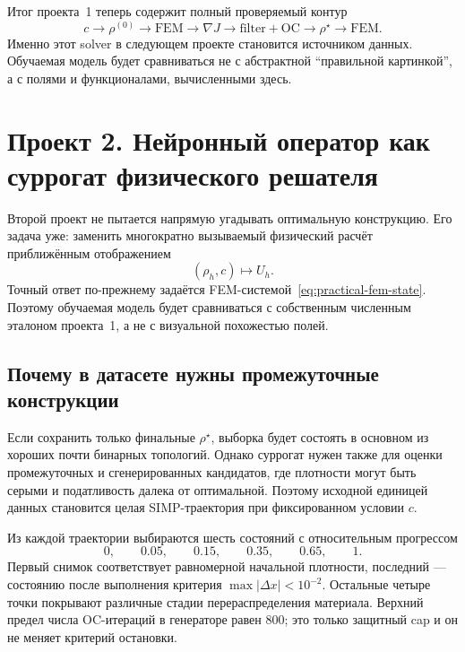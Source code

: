 Итог проекта~1 теперь содержит полный проверяемый контур
\begin{equation}
 c
 \longrightarrow
 \rho^{(0)}
 \longrightarrow
 \mathrm{FEM}
 \longrightarrow
 \nabla J
 \longrightarrow
 \mathrm{filter+OC}
 \longrightarrow
 \rho^\star
 \longrightarrow
 \mathrm{FEM}.
\end{equation}
Именно этот solver в следующем проекте становится источником данных. Обучаемая модель будет сравниваться не с абстрактной ``правильной картинкой'', а с полями и функционалами, вычисленными здесь.


\section{Проект 2. Нейронный оператор как суррогат физического решателя}
\label{sec:practical-project-neural-operator}

Второй проект не пытается напрямую угадывать оптимальную конструкцию. Его задача уже: заменить многократно вызываемый физический расчёт приближённым отображением
\begin{equation}
\label{eq:practical-v04-operator-map}
 (\rho_h,c)\longmapsto U_h.
\end{equation}
Точный ответ по-прежнему задаётся FEM-системой~\eqref{eq:practical-fem-state}. Поэтому обучаемая модель будет сравниваться с собственным численным эталоном проекта~1, а не с визуальной похожестью полей.

\subsection{Почему в датасете нужны промежуточные конструкции}
\label{subsec:practical-v04-why-trajectories}

Если сохранить только финальные $\rho^\star$, выборка будет состоять в основном из хороших почти бинарных топологий. Однако суррогат нужен также для оценки промежуточных и сгенерированных кандидатов, где плотности могут быть серыми и податливость далека от оптимальной. Поэтому исходной единицей данных становится целая SIMP-траектория при фиксированном условии $c$.

Из каждой траектории выбираются шесть состояний с относительным прогрессом
\begin{equation}
\label{eq:practical-v04-snapshot-fractions}
 0,\qquad
 0.05,\qquad
 0.15,\qquad
 0.35,\qquad
 0.65,\qquad
 1.
\end{equation}
Первый снимок соответствует равномерной начальной плотности, последний --- состоянию после выполнения критерия $\max|\Delta x|<10^{-2}$. Остальные четыре точки покрывают различные стадии перераспределения материала. Верхний предел числа OC-итераций в генераторе равен $800$; это только защитный cap и он не меняет критерий остановки.

